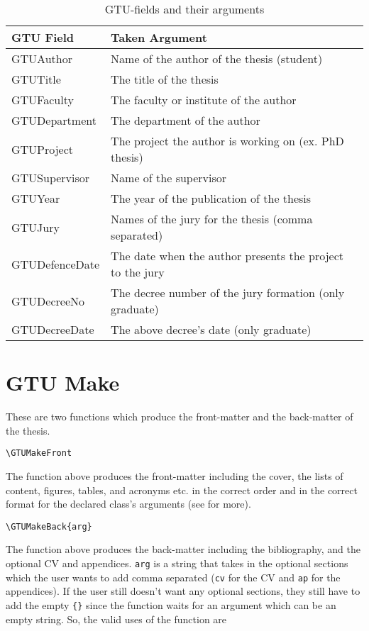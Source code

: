 \begin{table}
    \caption{GTU-fields and their arguments}
    \label{tab:fields}
    \centering
    \begin{tabular}{|l|l|l|}
        \hline
        \textbf{GTU Field} & \textbf{Taken Argument} \\
        \hline
        GTUAuthor & Name of the author of the thesis (student)\\
        GTUTitle & The title of the thesis\\
        GTUFaculty & The faculty or institute of the author\\
        GTUDepartment & The department of the author\\
        GTUProject & The project the author is working on (ex. PhD thesis)\\
        GTUSupervisor & Name of the supervisor\\
        GTUYear & The year of the publication of the thesis\\
        GTUJury & Names of the jury for the thesis (comma separated) \\
        GTUDefenceDate & The date when the author presents the project to the jury\\
        GTUDecreeNo & The decree number of the jury formation (only graduate)\\
        GTUDecreeDate & The above decree's date (only graduate)\\
        \hline
    \end{tabular}
\end{table}


\section{GTU Make}

These are two functions which produce the front-matter and the back-matter of the thesis.

	\texttt{\textbackslash GTUMakeFront}

The function above produces the front-matter including the cover, the lists of content, figures, tables, and acronyms etc. in the correct order and in the correct format for the declared class's arguments (see  for more).

	\texttt{\textbackslash GTUMakeBack\{arg\}}

The function above produces the back-matter including the bibliography, and the optional CV and appendices. \texttt{arg} is a string that takes in the optional sections which the user wants to add comma separated (\texttt{cv} for the CV and \texttt{ap} for the appendices). If the user still doesn't want any optional sections, they still have to add the empty \texttt{\{\}} since the function waits for an argument which can be an empty string. So, the valid uses of the function are 

